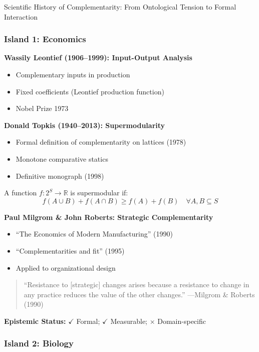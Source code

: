 \begin{chapter}{Scientific History of Complementarity: From Ontological Tension to Formal Interaction}
\subsubsection{Island 1: Economics}

\textbf{Wassily Leontief (1906--1999): Input-Output Analysis}
\begin{itemize}[noitemsep]
    \item Complementary inputs in production
    \item Fixed coefficients (Leontief production function)
    \item Nobel Prize 1973
\end{itemize}

\textbf{Donald Topkis (1940--2013): Supermodularity}
\begin{itemize}[noitemsep]
    \item Formal definition of complementarity on lattices (1978)
    \item Monotone comparative statics
    \item Definitive monograph (1998)
\end{itemize}

\begin{definition}
A function $f: 2^S \to \mathbb{R}$ is supermodular if:
\[
f(A \cup B) + f(A \cap B) \geq f(A) + f(B) \quad \forall A, B \subseteq S
\]
\end{definition}

\textbf{Paul Milgrom \& John Roberts: Strategic Complementarity}
\begin{itemize}[noitemsep]
    \item ``The Economics of Modern Manufacturing'' (1990)
    \item ``Complementarities and fit'' (1995)
    \item Applied to organizational design
\end{itemize}

\begin{quote}
``Resistance to [strategic] changes arises because a resistance to change in any practice reduces the value of the other changes.'' ---Milgrom \& Roberts (1990)
\end{quote}

\textbf{Epistemic Status:} $\checkmark$ Formal; $\checkmark$ Measurable; $\times$ Domain-specific

\subsubsection{Island 2: Biology}


\end{chapter}
